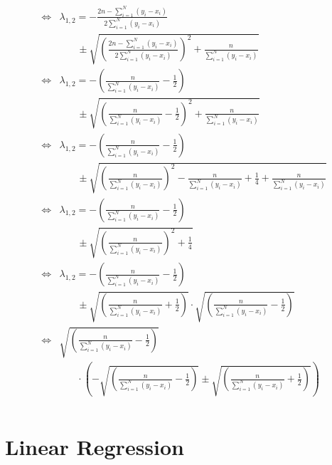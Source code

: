 \documentclass{article}
\begin{document}
\begin{align}
\begin{aligned}
\Leftrightarrow & \lambda_{1,2} = - \frac{2n - \sum_{i=1}^{N}( y_i - x_i)}{2 \sum_{i=1}^{N}( y_i - x_i)}\\
		      & ~~~~~~~~\pm \sqrt{(\frac{2n - \sum_{i=1}^{N}( y_i - x_i)}{2 \sum_{i=1}^{N}( y_i - x_i)})^2 +\frac{n}{\sum_{i=1}^{N}( y_i - x_i)}} \\
\Leftrightarrow & \lambda_{1,2} = - ( \frac{n}{\sum_{i=1}^{N}( y_i - x_i)} - \frac{1}{2})\\
		      & ~~~~~~~~\pm \sqrt{( \frac{n}{\sum_{i=1}^{N}( y_i - x_i)} - \frac{1}{2})^2 +\frac{n}{\sum_{i=1}^{N}( y_i - x_i)}} \\
\Leftrightarrow & \lambda_{1,2} = - ( \frac{n}{\sum_{i=1}^{N}( y_i - x_i)} - \frac{1}{2})\\
		      & ~~~~~~~~\pm \sqrt{( \frac{n}{\sum_{i=1}^{N}( y_i - x_i)})^2 -  \frac{n}{\sum_{i=1}^{N}( y_i - x_i)} + \frac{1}{4} +\frac{n}{\sum_{i=1}^{N}( y_i - x_i)}} \\
\Leftrightarrow & \lambda_{1,2} = - ( \frac{n}{\sum_{i=1}^{N}( y_i - x_i)} - \frac{1}{2})\\
		      & ~~~~~~~~\pm \sqrt{( \frac{n}{\sum_{i=1}^{N}( y_i - x_i)})^2 + \frac{1}{4}} \\
\Leftrightarrow & \lambda_{1,2} = - ( \frac{n}{\sum_{i=1}^{N}( y_i - x_i)} - \frac{1}{2})\\
		      & ~~~~~~~~\pm \sqrt{( \frac{n}{\sum_{i=1}^{N}( y_i - x_i)} + \frac{1}{2})} \cdot \sqrt{( \frac{n}{\sum_{i=1}^{N}( y_i - x_i)} - \frac{1}{2})} \\
\Leftrightarrow & \sqrt{( \frac{n}{\sum_{i=1}^{N}( y_i - x_i)} - \frac{1}{2})}\\
		      & ~~~~~~~~\cdot \left(- \sqrt{( \frac{n}{\sum_{i=1}^{N}( y_i - x_i)} - \frac{1}{2})} \pm \sqrt{( \frac{n}{\sum_{i=1}^{N}( y_i - x_i)} + \frac{1}{2})} \right)\\
\end{aligned}
\end{align}

 
\pagebreak
\section{Linear Regression}
\end{document}
